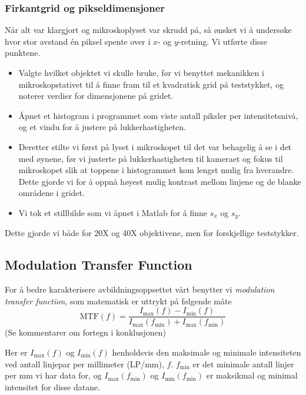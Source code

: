 \documentclass[a4paper,11pt, twocolumn]{article}
\begin{document}
\subsubsection{Firkantgrid og pikseldimensjoner}
Når alt var klargjort og mikroskoplyset var skrudd på, så ønsket vi å undersøke hvor stor avstand \'en piksel spente over i $x$- og $y$-retning. Vi utførte disse punktene.

\begin{itemize}
	\item Valgte hvilket objektet vi skulle bruke, før vi benyttet mekanikken i mikroskopstativet til å finne fram til et kvadratisk grid på teststykket, og noterer verdier for dimensjonene på gridet.
	\item Åpnet et histogram i programmet som viste antall piksler per intensitetsnivå, og et vindu for å justere på lukkerhastigheten.
	\item Deretter stilte vi først på lyset i mikroskopet til det var behagelig å se i det med øynene, før vi justerte på lukkerhastigheten til kameraet og fokus til mikroskopet slik at toppene i histogrammet kom lengst mulig fra hverandre. Dette gjorde vi for å oppnå høyest mulig kontrast mellom linjene og de blanke områdene i gridet.
	\item Vi tok et stillbilde som vi åpnet i Matlab for å finne $s_x$ og $s_y$. 
\end{itemize}

Dette gjorde vi både for 20X og 40X objektivene, men for forskjellige teststykker.

\subsection{Modulation Transfer Function}
For å bedre karakterisere avbildningsoppsettet vårt benytter vi \textit{modulation transfer function}, som matematisk er uttrykt på følgende måte
\begin{equation}
	\text{MTF}(f) = \frac{I_{\max}(f)-I_{\min}(f)}{I_{\max}(f_{\min})+I_{\max}(f_{\min})}
	\label{eq:MTF}
\end{equation}
(Se kommentarer om fortegn i konklusjonen)

Her er $I_{\text{max}}(f)$ og $I_\text{min}(f)$ henholdsvis den maksimale og minimale intensiteten ved antall linjepar per millimeter (LP/mm), $f$. $f_\text{min}$ er det minimale antall linjer per mm vi har data for, og $I_\text{max}(f_\text{min})$ og $I_\text{min}(f_\text{min})$ er maksikmal og minimal intensitet for disse datane.
\end{document}
